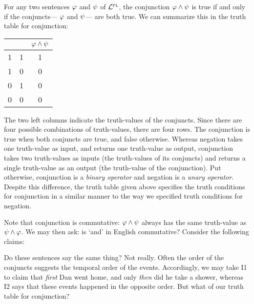 For any two sentences $\varphi$ and $\psi$ of $\mathcal{L}^{\textsc{pl}}$, the conjunction $\varphi\wedge\psi$ is true if and only if the conjuncts--- $\varphi$ and $\psi$--- are both true. We can summarize this in the truth table for conjunction:
\begin{center}
\begin{tabular}{c|c|c}
\metaA{} & \metaB{} & $\varphi{} \wedge \psi{}$\\
\hline
1 & 1 & 1\\
1 & 0 & 0\\
0 & 1 & 0\\
0 & 0 & 0
\end{tabular}
\end{center}

The two left columns indicate the truth-values of the conjuncts.
Since there are four possible combinations of truth-values, there are four rows.
The conjunction is true when both conjuncts are true, and false otherwise.
Whereas negation takes one truth-value as input, and returns one truth-value as output, conjunction takes two truth-values as inputs (the truth-values of its conjuncts) and returns a single truth-value as an output (the truth-value of the conjunction). 
Put otherwise, conjunction is a \textit{binary operator} and negation is a \textit{unary operator}.
Despite this difference, the truth table given above specifies the truth conditions for conjunction in a similar manner to the way we specified truth conditions for negation.

Note that conjunction is commutative: $\varphi{}\wedge\psi{}$ always has the same truth-value as $\psi{}\wedge\varphi{}$.
We may then ask: is `and' in English commutative?
Consider the following claims:

\begin{earg}
\end{earg}

Do these sentences say the same thing?
Not really.
Often the order of the conjuncts suggests the temporal order of the events.
Accordingly, we may take I1 to claim that \textit{first} Dan went home, and only \textit{then} did he take a shower, whereas I2 says that these events happened in the opposite order.
But what of our truth table for conjunction?

